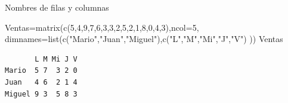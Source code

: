 \documentclass[
  ignorenonframetext,
  aspectratio=169,
  spanish,
]{beamer}
\newenvironment{Shaded}{\begin{snugshade}}{\end{snugshade}}
\newcommand{\AttributeTok}[1]{\textcolor[rgb]{0.40,0.45,0.13}{#1}}
\newcommand{\DecValTok}[1]{\textcolor[rgb]{0.68,0.00,0.00}{#1}}
\newcommand{\FunctionTok}[1]{\textcolor[rgb]{0.28,0.35,0.67}{#1}}
\newcommand{\NormalTok}[1]{\textcolor[rgb]{0.00,0.23,0.31}{#1}}
\newcommand{\OtherTok}[1]{\textcolor[rgb]{0.00,0.23,0.31}{#1}}
\newcommand{\StringTok}[1]{\textcolor[rgb]{0.13,0.47,0.30}{#1}}
\begin{document}
\begin{frame}[fragile]{Nombres de filas y columnas}
\label{nombres-de-filas-y-columnas}
\begin{Shaded}
\begin{Highlighting}[]
\NormalTok{Ventas}\OtherTok{=}\FunctionTok{matrix}\NormalTok{(}\FunctionTok{c}\NormalTok{(}\DecValTok{5}\NormalTok{,}\DecValTok{4}\NormalTok{,}\DecValTok{9}\NormalTok{,}\DecValTok{7}\NormalTok{,}\DecValTok{6}\NormalTok{,}\DecValTok{3}\NormalTok{,}\DecValTok{3}\NormalTok{,}\DecValTok{2}\NormalTok{,}\DecValTok{5}\NormalTok{,}\DecValTok{2}\NormalTok{,}\DecValTok{1}\NormalTok{,}\DecValTok{8}\NormalTok{,}\DecValTok{0}\NormalTok{,}\DecValTok{4}\NormalTok{,}\DecValTok{3}\NormalTok{),}\AttributeTok{ncol=}\DecValTok{5}\NormalTok{, }
    \AttributeTok{dimnames=}\FunctionTok{list}\NormalTok{(}\FunctionTok{c}\NormalTok{(}\StringTok{"Mario"}\NormalTok{,}\StringTok{"Juan"}\NormalTok{,}\StringTok{"Miguel"}\NormalTok{),}\FunctionTok{c}\NormalTok{(}\StringTok{"L"}\NormalTok{,}\StringTok{"M"}\NormalTok{,}\StringTok{"Mi"}\NormalTok{,}\StringTok{"J"}\NormalTok{,}\StringTok{"V"}\NormalTok{) ))}
\NormalTok{Ventas}
\end{Highlighting}
\end{Shaded}

\begin{verbatim}
       L M Mi J V
Mario  5 7  3 2 0
Juan   4 6  2 1 4
Miguel 9 3  5 8 3
\end{verbatim}
\end{frame}
\end{document}
